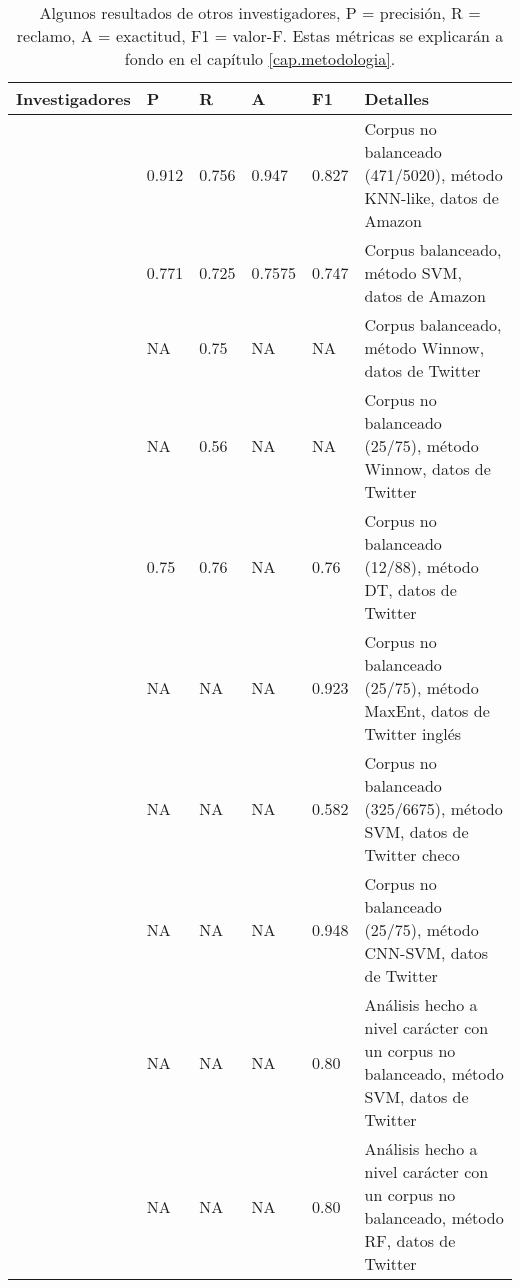 \begin{table}[!ht]
	\caption{Algunos resultados de otros investigadores, P  = precisión, R = reclamo, A = exactitud, F1 = valor-F. Estas métricas se explicarán a fondo en el capítulo \ref{cap.metodologia}.}
	\begin{tabular}{|l|l|l|l|l|>{\raggedleft\arraybackslash}p{4cm}|}
		\hline
		Investigadores                  & P     & R     & A      & F1    & Detalles                                                                                  \\ \hline
		\textcite{davidov2010semi}      & 0.912 & 0.756 & 0.947  & 0.827 & Corpus no balanceado (471/5020), método  KNN-like, datos de Amazon                        \\ \hline
		\textcite{reyes2012making}      & 0.771 & 0.725 & 0.7575 & 0.747 & Corpus balanceado, método SVM, datos de  Amazon                                           \\ \hline
		\textcite{liebrecht2013perfect} & NA    & 0.75  & NA     & NA    & Corpus balanceado, método Winnow, datos de Twitter                                        \\ \hline
		\textcite{liebrecht2013perfect} & NA    & 0.56  & NA     & NA    & Corpus no balanceado (25/75), método Winnow, datos de Twitter                             \\ \hline
		\textcite{barbieri2014italian}  & 0.75  & 0.76  & NA     & 0.76  & Corpus no balanceado (12/88), método \gls{DT}, datos de  Twitter                          \\ \hline

		\textcite{ptavcek2014sarcasm}   & NA    & NA    & NA     & 0.923 & Corpus no balanceado (25/75), método  MaxEnt, datos de Twitter inglés                     \\ \hline
		\textcite{ptavcek2014sarcasm}   & NA    & NA    & NA     & 0.582 & Corpus no balanceado (325/6675), método  SVM, datos de Twitter checo                      \\ \hline
		\textcite{poria2016deeper}      & NA    & NA    & NA     & 0.948 & Corpus no balanceado (25/75), método  CNN-SVM, datos de Twitter                           \\ \hline
		\textcite{lopez2016character}   & NA    & NA    & NA     & 0.80  & Análisis hecho a nivel carácter con un corpus no balanceado, método SVM, datos de Twitter \\ \hline       \textcite{lopez2016character}      & NA        & NA     & NA        & 0.80     & Análisis hecho a nivel carácter con un corpus no balanceado, método RF, datos de Twitter                                                                                       \\ \hline
	\end{tabular}
	
	\label{tab:resultados}
\end{table}

